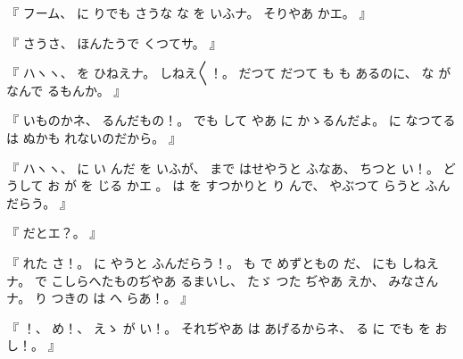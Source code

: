 %
『
フーム、
%
に
りでも
さうな
な
を
いふナ。
%
そりやあ
かエ。
』

%
『
さうさ、
%
ほんたうで
くつてサ。
』

%
『
ハヽヽ、
%
を
ひねえナ。
%
しねえ〳〵！。
%
だつて
だつて
も
も
あるのに、
%
な
がなんで
るもんか。
』

%
『
いものかネ、
%
るんだもの！。
%
でも
して
やあ
に
かゝるんだよ。
%
に
なつてる
は
ぬかも
れないのだから。
』

%
『
ハヽヽ、
%
に
い
んだ
を
いふが、
%
まで
はせやうと
ふなあ、
%
ちつと
い！。
%
どうして
お
が
を
じる
かエ
。
%
%
は
を
すつかりと
り
んで、
やぶつて
らうと
ふんだらう。
』

%
『
だとエ？。
』

%
『
れた
さ！。
%
に
やうと
ふんだらう！。
%
も
で
めずともの
だ、
%
にも
しねえナ。
%
で
こしらへたものぢやあ
るまいし、
%
たゞ
つた
ぢやあ
えか、
%
みなさんナ。
%
り
つきの
は
へ
らあ！。
』

%
『
！、
%
め！、
%
えゝ
が
い！。
%
それぢやあ
は
あげるからネ、
%
る
に
でも
を
お
し！。
』
